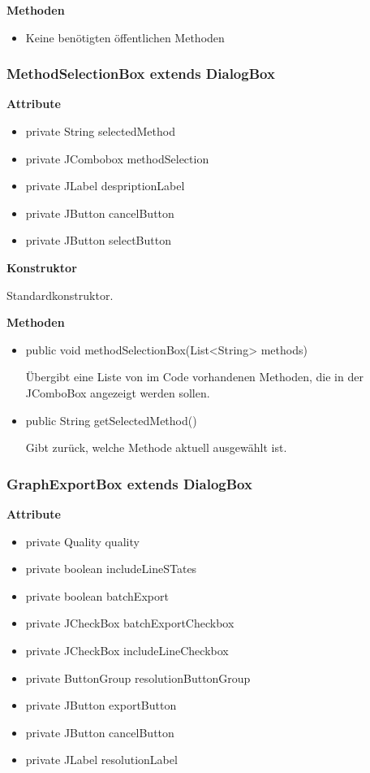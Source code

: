 \textbf{Methoden}
\begin{itemize}
	\item Keine benötigten öffentlichen Methoden
\end{itemize}

\subsubsection{MethodSelectionBox extends DialogBox}
\textbf{Attribute}
\begin{itemize}
	\item private String selectedMethod
	\item private JCombobox methodSelection
	\item private JLabel despriptionLabel
	\item private JButton cancelButton
	\item private JButton selectButton
\end{itemize}

\textbf{Konstruktor}\par
Standardkonstruktor.

\textbf{Methoden}
\begin{itemize}
	\item public void methodSelectionBox(List<String> methods)\par
		Übergibt eine Liste von im Code vorhandenen Methoden, die in der JComboBox angezeigt werden sollen.
	\item public String getSelectedMethod()\par
		Gibt zurück, welche Methode aktuell ausgewählt ist.
\end{itemize}


\subsubsection{GraphExportBox extends DialogBox}
\textbf{Attribute}
\begin{itemize}
	\item private Quality quality
	\item private boolean includeLineSTates
	\item private boolean batchExport
	\item private JCheckBox batchExportCheckbox
	\item private JCheckBox includeLineCheckbox
	\item private ButtonGroup resolutionButtonGroup
	\item private JButton exportButton
	\item private JButton cancelButton
	\item private JLabel resolutionLabel
\end{itemize}

